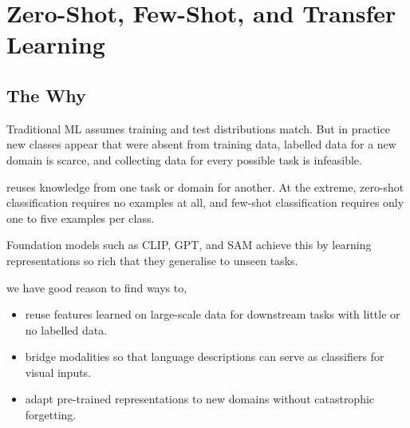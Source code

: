 
\chapter{Zero-Shot, Few-Shot, and Transfer Learning}


\section{The Why}


Traditional ML assumes training and test distributions match. But in practice new classes appear that were absent from training data, labelled data for a new domain is scarce, and collecting data for every possible task is infeasible.

 reuses knowledge from one task or domain for another. At the extreme, zero-shot classification requires no examples at all, and few-shot classification requires only one to five examples per class.

Foundation models such as CLIP, GPT, and SAM achieve this by learning representations so rich that they generalise to unseen tasks.

 we have good reason to find ways to,
\begin{itemize}
    \item reuse features learned on large-scale data for downstream tasks with little or no labelled data.
    \item bridge modalities so that language descriptions can serve as classifiers for visual inputs.
    \item adapt pre-trained representations to new domains without catastrophic forgetting.
\end{itemize}

